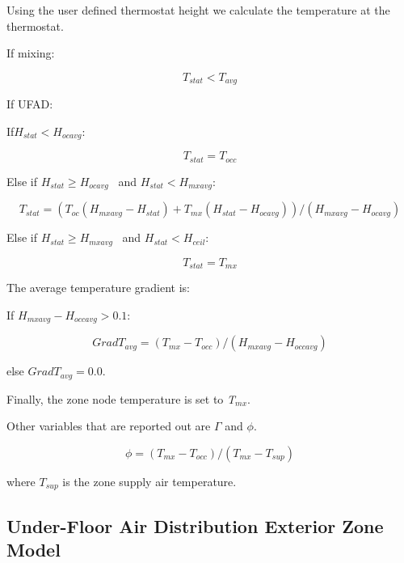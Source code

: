 Using the user defined thermostat height we calculate the temperature at the thermostat.

If mixing:

\begin{equation}
{T_{stat}} < {T_{avg}}
\end{equation}

If UFAD:

If\({H_{stat}} < {H_{ocavg}}\):

\begin{equation}
{T_{stat}} = {T_{occ}}
\end{equation}

Else if \({H_{stat}} \ge {H_{ocavg}}\) ~and \({H_{stat}} < {H_{mxavg}}\):

\begin{equation}
{T_{stat}} = \left( {{T_{oc}}\left( {{H_{mxavg}} - {H_{stat}}} \right) + {T_{mx}}\left( {{H_{stat}} - {H_{ocavg}}} \right)} \right)/\left( {{H_{mxavg}} - {H_{ocavg}}} \right)
\end{equation}

Else if \({H_{stat}} \ge {H_{mxavg}}\) ~and \({H_{stat}} < {H_{ceil}}\):

\begin{equation}
{T_{stat}} = {T_{mx}}
\end{equation}

The average temperature gradient is:

If \({H_{mxavg}} - {H_{occavg}} > 0.1\):

\begin{equation}
Grad{T_{avg}} = ({T_{mx}} - {T_{occ}})/({H_{mxavg}} - {H_{occavg}})
\end{equation}

else \(Grad{T_{avg}} = 0.0\).

Finally, the zone node temperature is set to \emph{T\(_{mx}\)}.

Other variables that are reported out are \(\Gamma\) and \(\phi\).

\begin{equation}
\phi  = ({T_{mx}} - {T_{occ}})/({T_{mx}} - {T_{sup}})
\end{equation}

where \({T_{sup}}\) is the zone supply air temperature.

\subsection{Under-Floor Air Distribution Exterior Zone Model}\label{under-floor-air-distribution-exterior-zone-model}

